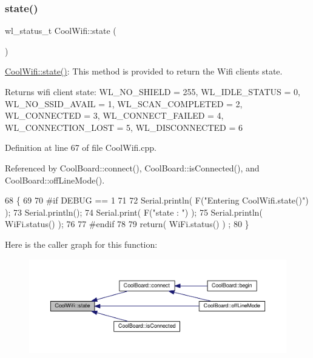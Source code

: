 \mbox{\label{classCoolWifi_a1c7b4d82a4098d346e7593dce92039fa}} 
\subsubsection{\texorpdfstring{state()}{state()}}
{\footnotesize\ttfamily wl\+\_\+status\+\_\+t Cool\+Wifi\+::state (\begin{DoxyParamCaption}{ }\end{DoxyParamCaption})}

\hyperlink{classCoolWifi_a1c7b4d82a4098d346e7593dce92039fa}{Cool\+Wifi\+::state()}\+: This method is provided to return the Wifi client\textquotesingle{}s state. \begin{DoxyReturn}{Returns}
wifi client state\+: W\+L\+\_\+\+N\+O\+\_\+\+S\+H\+I\+E\+LD = 255, W\+L\+\_\+\+I\+D\+L\+E\+\_\+\+S\+T\+A\+T\+US = 0, W\+L\+\_\+\+N\+O\+\_\+\+S\+S\+I\+D\+\_\+\+A\+V\+A\+IL = 1, W\+L\+\_\+\+S\+C\+A\+N\+\_\+\+C\+O\+M\+P\+L\+E\+T\+ED = 2, W\+L\+\_\+\+C\+O\+N\+N\+E\+C\+T\+ED = 3, W\+L\+\_\+\+C\+O\+N\+N\+E\+C\+T\+\_\+\+F\+A\+I\+L\+ED = 4, W\+L\+\_\+\+C\+O\+N\+N\+E\+C\+T\+I\+O\+N\+\_\+\+L\+O\+ST = 5, W\+L\+\_\+\+D\+I\+S\+C\+O\+N\+N\+E\+C\+T\+ED = 6 
\end{DoxyReturn}


Definition at line 67 of file Cool\+Wifi.\+cpp.



Referenced by Cool\+Board\+::connect(), Cool\+Board\+::is\+Connected(), and Cool\+Board\+::off\+Line\+Mode().


\begin{DoxyCode}
68 \{
69 
70 \textcolor{preprocessor}{#if DEBUG == 1 }
71 
72     Serial.println( F(\textcolor{stringliteral}{"Entering CoolWifi.state()"}) );
73     Serial.println();   
74     Serial.print( F(\textcolor{stringliteral}{"state : "}) );
75     Serial.println( WiFi.status() );
76 
77 \textcolor{preprocessor}{#endif}
78     
79     \textcolor{keywordflow}{return}( WiFi.status() ) ;
80 \}
\end{DoxyCode}
Here is the caller graph for this function\+:
\nopagebreak
\begin{figure}[H]
\begin{center}
\leavevmode
\includegraphics[width=350pt]{classCoolWifi_a1c7b4d82a4098d346e7593dce92039fa_icgraph}
\end{center}
\end{figure}


